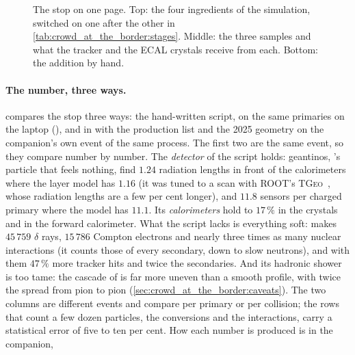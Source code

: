 \begin{figure}[htbp]\centering
\resizebox{0.9\textwidth}{!}{}
\caption[The stop on one page: three samples, one addition]{The stop on one
page. Top: the four ingredients of the simulation, switched on one after the
other in \cref{tab:crowd_at_the_border:stages}. Middle: the three samples and
what the tracker and the ECAL crystals receive from each. Bottom: the
addition by hand.}
\label{fig:crowd_at_the_border:chain}
\label{fig:crowd_at_the_border:windows_sketch}
\end{figure}

\paragraph{The number, three ways.}
\label{sec:crowd_at_the_border:validation}
 compares the stop three ways: the
hand-written script, \GEANT on the same primaries on the laptop
(), and \GEANT in \CMSSW with the production list
 and the 2025 geometry on the companion's own event of
the same process. The first two are the same event, so they compare number
by number. The \emph{detector} of the script holds: geantinos, \GEANT's
particle that feels nothing, find $1.24$ radiation lengths in front of
the calorimeters where the layer model has $1.16$ (it was tuned to a
scan with ROOT's \textsc{TGeo}~\cite{Brun:2003TGeo}, whose radiation lengths
are a few per cent longer), and $11.8$
sensors per charged primary where the model has
$11.1$. Its
\emph{calorimeters} hold to $17\,\%$ in the crystals and in the forward
calorimeter. What the script lacks is everything soft: \GEANT makes
$45\,759$ $\delta$ rays, $15\,786$ Compton
electrons and nearly three times as many nuclear interactions (it counts
those of every secondary, down to slow neutrons), and with them
$47\,\%$ more tracker
hits and twice the secondaries. And its hadronic shower is too tame: the
cascade of \GEANT is far more uneven than a smooth profile, with twice
the spread from pion to pion (\cref{sec:crowd_at_the_border:caveats}).
The two \GEANT columns are different events and compare per primary or
per collision; the rows that count a few dozen particles, the conversions
and the interactions, carry a statistical error of five to ten per cent. How
each number is produced is in the companion,
\begin{center}
\end{center}

